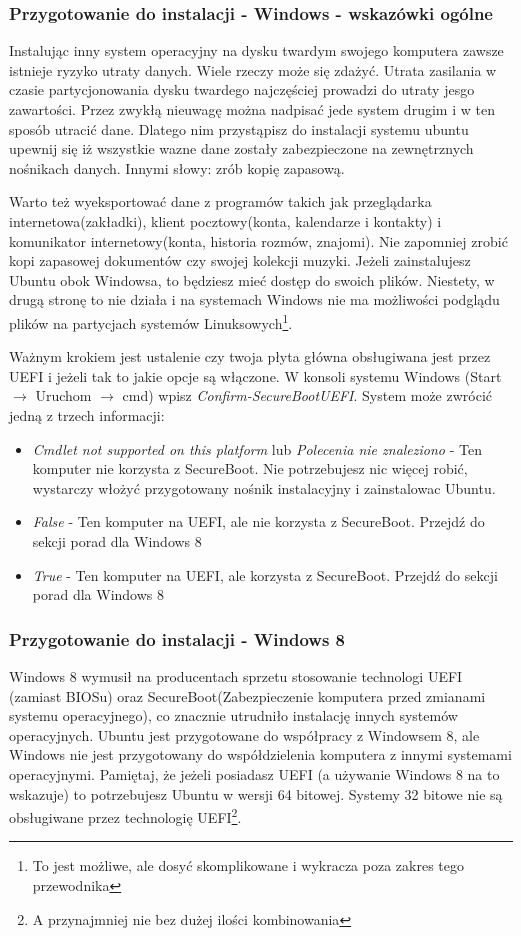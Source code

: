 \subsubsection{Przygotowanie do instalacji - Windows - wskazówki ogólne}
\label{sec:przygotowanie_windows}
Instalując inny system operacyjny na dysku twardym swojego komputera zawsze istnieje ryzyko utraty danych. Wiele rzeczy może się zdażyć. Utrata zasilania w czasie partycjonowania dysku twardego najczęściej prowadzi do utraty jesgo zawartości. Przez zwykłą nieuwagę można nadpisać jede system drugim i w ten sposób utracić dane. Dlatego nim przystąpisz do instalacji systemu ubuntu upewnij się iż wszystkie wazne dane zostały zabezpieczone na zewnętrznych nośnikach danych. Innymi słowy: zrób kopię zapasową.

Warto też wyeksportować dane z programów takich jak przeglądarka internetowa(zakładki), klient pocztowy(konta, kalendarze i kontakty) i komunikator internetowy(konta, historia rozmów, znajomi). Nie zapomniej zrobić kopi zapasowej dokumentów czy swojej kolekcji muzyki. Jeżeli zainstalujesz Ubuntu obok Windowsa, to będziesz mieć dostęp do swoich plików. Niestety, w drugą stronę to nie działa i na systemach Windows nie ma możliwości podglądu plików na partycjach systemów Linuksowych\footnote{To jest możliwe, ale dosyć skomplikowane i wykracza poza zakres tego przewodnika}.

Ważnym krokiem jest ustalenie czy twoja płyta główna obsługiwana jest przez UEFI i jeżeli tak to jakie opcje są włączone. W konsoli systemu Windows (Start $\rightarrow$ Uruchom $\rightarrow$ cmd) wpisz \textit{Confirm-SecureBootUEFI}. System może zwrócić jedną z trzech informacji:
\begin{itemize}
\item \textit{Cmdlet not supported on this platform} lub \textit{Polecenia nie znaleziono} - Ten komputer nie korzysta z SecureBoot. Nie potrzebujesz nic więcej robić, wystarczy włożyć przygotowany nośnik instalacyjny i zainstalowac Ubuntu.
\item \textit{False} - Ten komputer na UEFI, ale nie korzysta z SecureBoot. Przejdź do sekcji porad dla Windows 8
\item \textit{True} - Ten komputer na UEFI, ale korzysta z SecureBoot. Przejdź do sekcji porad dla Windows 8
\end{itemize}
\subsubsection{Przygotowanie do instalacji - Windows 8}
\label{sec:przygotowanie_windows8}
Windows 8 wymusił na producentach sprzetu stosowanie technologi UEFI (zamiast BIOSu) oraz SecureBoot(Zabezpieczenie komputera przed zmianami systemu operacyjnego), co znacznie utrudniło instalację innych systemów operacyjnych. Ubuntu jest przygotowane do współpracy z Windowsem 8, ale Windows nie jest przygotowany do współdzielenia komputera z innymi systemami operacyjnymi. Pamiętaj, że jeżeli posiadasz UEFI (a używanie Windows 8 na to wskazuje) to potrzebujesz Ubuntu w wersji 64 bitowej. Systemy 32 bitowe nie są obsługiwane przez technologię UEFI\footnote{A przynajmniej nie bez dużej ilości kombinowania}.

